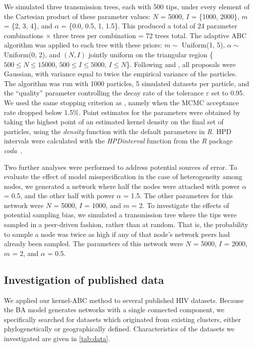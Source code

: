 \documentclass[12pt]{article}\usepackage[]{graphicx}\usepackage[]{color}
\newcommand{\software}[1]{\textit{#1}}
\newcommand{\sett}[1]{\{#1\}}
\begin{document}
We simulated three transmission trees, each with 500 tips, under every element
of the Cartesian product of these parameter values: $N$ = 5000, $I$ =
\sett{1000, 2000}, $m$ = \sett{2, 3, 4}, and $\alpha$ = \sett{0.0, 0.5, 1,
1.5}. This produced a total of 24 parameter combinations $\times$ three trees
per combination = 72 trees total. The adaptive \gls{ABC} algorithm was applied
to each tree with these priors: $m \sim$ Uniform(1, 5), $\alpha \sim$
Uniform(0, 2), and $(N, I)$ jointly uniform on the triangular region \{$500
\leq N \leq 15000$, $500 \leq I \leq 5000$, $I \leq N$\}. Following
\textcite{del2012adaptive} and \textcite{beaumont2009adaptive}, all proposals
were Gaussian, with variance equal to twice the empirical variance of the
particles. The algorithm was run with 1000 particles, 5 simulated datasets per
particle, and the ``quality'' parameter controlling the decay rate of the
tolerance $\varepsilon$ set to 0.95. We used the same stopping criterion as
\citeauthor{del2012adaptive}, namely when the \gls{MCMC} acceptance rate
dropped below 1.5\%. Point estimates for the parameters were obtained by taking
the highest point of an estimated kernel density on the final set of particles,
using the \software{density} function with the default parameters in
\software{R}. \gls{HPD} intervals were calculated with the
\software{HPDinterval} function from the \software{R} package
\software{coda}~\autocite{plummer2006coda}.

Two further analyses were performed to address potential sources of error. To
evaluate the effect of model misspecification in the case of heterogeneity
among nodes, we generated a network where half the nodes were attached with
power $\alpha$ = 0.5, and the other half with power $\alpha$ = 1.5. The other
parameters for this network were $N$ = 5000, $I$ = 1000, and $m$ = 2. To
investigate the effects of potential sampling bias, we simulated a transmission
tree where the tips were sampled in a peer-driven fashion, rather than at
random. That is, the probability to sample a node was twice as high if any of
that node's network peers had already been sampled. The parameters of this
network were $N$ = 5000, $I$ = 2000, $m$ = 2, and $\alpha$ = 0.5.

\subsection*{Investigation of published data}

We applied our kernel-ABC method to several published HIV datasets. Because the
\gls{BA} model generates networks with a single connected component, we
specifically searched for datasets which originated from existing clusters,
either phylogenetically or geographically defined. Characteristics of the
datasets we investigated are given in \cref{tab:data}.
\end{document}
